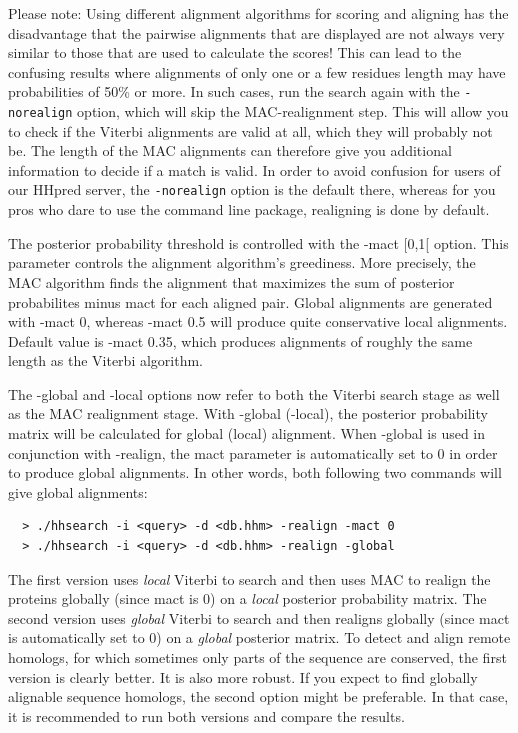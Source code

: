 \documentclass[11pt,a4paper]{article}
\begin{document}
Please note: Using different alignment algorithms for scoring and aligning has the 
disadvantage that the pairwise alignments that are displayed are not always very similar to 
those that are used to calculate the scores! This can lead to the confusing results 
where alignments of only one or a few residues length may have probabilities of 50\% 
or more. In such cases, run the search again with the \verb`-norealign` option, which will 
skip the MAC-realignment step. This will allow you to check if the Viterbi alignments 
are valid at all, which they will probably not be. The length of the MAC alignments 
can therefore give you additional information to decide if a match is valid. In order
to avoid confusion for users of our HHpred server, the \verb`-norealign` option is the 
default there, whereas for you pros who dare to use the command line package, 
realigning is done by default.

The posterior probability threshold is controlled with the -mact [0,1[ option. 
This parameter controls the alignment algorithm's greediness. More precisely, the 
MAC algorithm finds the alignment that maximizes the sum of posterior probabilites 
minus mact for each aligned pair. Global alignments are generated with -mact 0, 
whereas -mact 0.5 will produce quite conservative local alignments. Default value is 
-mact 0.35, which produces alignments of roughly the same length as the Viterbi 
algorithm. 

The -global and -local options now refer to both the Viterbi search stage as 
well as the MAC realignment stage. With -global (-local), the posterior probability 
matrix will be calculated for global (local) alignment. When -global is used in 
conjunction with -realign, the mact parameter is automatically set to 0 in order to 
produce global alignments. In other words, both following two commands will give 
global alignments:
\begin{verbatim}
  > ./hhsearch -i <query> -d <db.hhm> -realign -mact 0
  > ./hhsearch -i <query> -d <db.hhm> -realign -global
\end{verbatim}

The first version uses \emph{local} Viterbi to search and then uses MAC to realign the 
proteins globally (since mact is 0) on a \emph{local} posterior probability matrix. The 
second version uses \emph{global} Viterbi to search and then realigns globally (since mact 
is automatically set to 0) on a \emph{global} posterior matrix. To detect and align remote 
homologs, for which sometimes only parts of the sequence are conserved, the first 
version is clearly better. It is also more robust. If you expect to find globally 
alignable sequence homologs, the second option might be preferable. In that case, 
it is recommended to run both versions and compare the results. 
\end{document}
